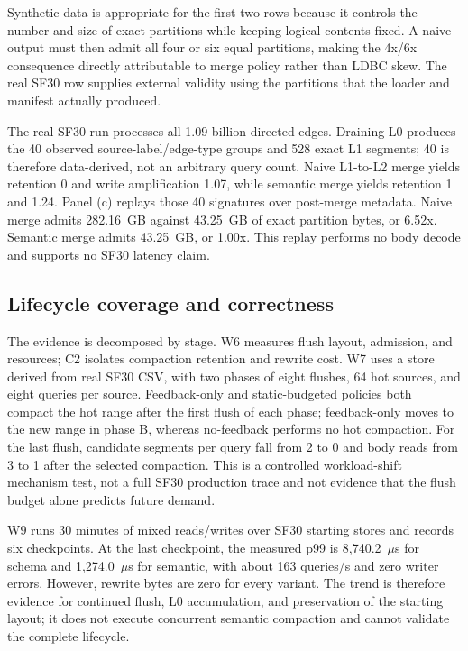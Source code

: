 \documentclass[sigconf,screen]{cidr-2027}
\begin{document}
Synthetic data is appropriate for the first two rows because it controls the
number and size of exact partitions while keeping logical contents fixed. A
naive output must then admit all four or six equal partitions, making the
4x/6x consequence directly attributable to merge policy rather than LDBC
skew. The real SF30 row supplies external validity using the partitions that
the loader and manifest actually produced.

The real SF30 run processes all 1.09 billion directed edges. Draining L0
produces the 40 observed source-label/edge-type groups and 528 exact L1
segments; 40 is therefore data-derived, not an arbitrary query count. Naive
L1-to-L2 merge yields retention 0 and write amplification 1.07, while semantic
merge yields retention 1 and 1.24. Panel (c) replays those 40 signatures over
post-merge metadata. Naive merge admits 282.16~GB against 43.25~GB of exact
partition bytes, or 6.52x. Semantic merge admits 43.25~GB, or 1.00x. This replay
performs no body decode and supports no SF30 latency claim.

\subsection{Lifecycle coverage and correctness}

The evidence is decomposed by stage. W6 measures flush layout, admission, and
resources; C2 isolates compaction retention and rewrite cost. W7 uses a store
derived from real SF30 CSV, with two phases of eight flushes, 64 hot sources,
and eight queries per source. Feedback-only and static-budgeted policies both
compact the hot range after the first flush of each phase; feedback-only moves
to the new range in phase B, whereas no-feedback performs no hot compaction.
For the last flush, candidate segments per query fall from 2 to 0 and body
reads from 3 to 1 after the selected compaction. This is a controlled
workload-shift mechanism test, not a full SF30 production trace and not evidence
that the flush budget alone predicts future demand.

W9 runs 30 minutes of mixed reads/writes over SF30 starting stores and records
six checkpoints. At the last checkpoint, the measured p99 is 8,740.2~$\mu$s
for schema and 1,274.0~$\mu$s for semantic, with about 163 queries/s and zero
writer errors. However, rewrite bytes are zero for every variant. The trend is
therefore evidence for continued flush, L0 accumulation, and preservation of
the starting layout; it does not execute concurrent semantic compaction and
cannot validate the complete lifecycle.
\end{document}
